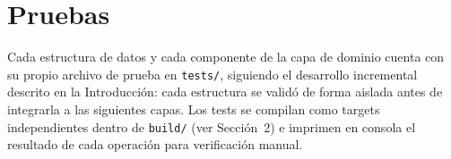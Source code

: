 \documentclass[11pt,a4paper]{article}
\begin{document}

\newpage
\section{Pruebas}
\label{sec:pruebas}

Cada estructura de datos y cada componente de la capa de dominio cuenta
con su propio archivo de prueba en \texttt{tests/}, siguiendo el
desarrollo incremental descrito en la Introducción: cada estructura se
validó de forma aislada antes de integrarla a las siguientes capas. Los
tests se compilan como targets independientes dentro de \texttt{build/}
(ver Sección~2) e imprimen en consola el resultado de cada operación
para verificación manual.
\end{document}
